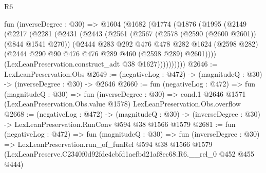 \begin{lexlean}{R6}
\begin{coremodule}
  fun (inverseDegree : @30) =>
  @1604
    (@1682
      (@1774
        (@1876
          (@1995
            (@2149
              (@2217
                (@2281
                  (@2431
                    (@2443
                      (@2561
                        (@2567
                          (@2578 (@2590 (@2600 @2601)) (@844 @1541 @270))
                          (@2444
                            @283
                            @292
                            @476
                            @478
                            @282
                            @1624
                            (@2598 @282)
                            (@2444 @290 @90 @476 @476 @289 @460 (@2598 @289) @2601))))
                      (LexLeanPreservation.construct_adt @38 @1627))))))))))
@2646 := LexLeanPreservation.Obs
@2649 := (negativeLog : @472) -> (magnitudeQ : @30) -> (inverseDegree : @30) -> @2646
@2660 := fun (negativeLog : @472) =>
  fun (magnitudeQ : @30) =>
  fun (inverseDegree : @30) =>
  cond.{1} @2646 @1571 (LexLeanPreservation.Obs.value @1578) LexLeanPreservation.Obs.overflow
@2668 := (negativeLog : @472) ->
  (magnitudeQ : @30) -> (inverseDegree : @30) -> LexLeanPreservation.RunConv @594 @38 @1566 @1579
@2681 := fun (negativeLog : @472) =>
  fun (magnitudeQ : @30) =>
  fun (inverseDegree : @30) =>
  LexLeanPreservation.run_of_funRel
    @594
    @38
    @1566
    @1579
    (LexLeanPreserve.C2340f0d92fde4cbfd1aefbd21af8ec68.R6.__rel_0 @452 @455 @444)
\end{coremodule}
\end{lexlean}
